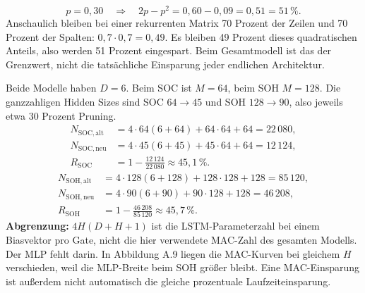 \[
p=0{,}30\quad\Rightarrow\quad 2p-p^2=0{,}60-0{,}09=0{,}51=51\,\%.
\]
Anschaulich bleiben bei einer rekurrenten Matrix 70 Prozent der Zeilen und 70 Prozent der Spalten: $0{,}7\cdot0{,}7=0{,}49$. Es bleiben 49 Prozent dieses quadratischen Anteils, also werden 51 Prozent eingespart. Beim Gesamtmodell ist das der Grenzwert, nicht die tatsächliche Einsparung jeder endlichen Architektur.

Beide Modelle haben $D=6$. Beim SOC ist $M=64$, beim SOH $M=128$. Die ganzzahligen Hidden Sizes sind SOC $64\to45$ und SOH $128\to90$, also jeweils etwa 30 Prozent Pruning.
\[
\begin{aligned}
N_{\mathrm{SOC,alt}}&=4\cdot64(6+64)+64\cdot64+64=22\,080,\\
N_{\mathrm{SOC,neu}}&=4\cdot45(6+45)+45\cdot64+64=12\,124,\\
R_{\mathrm{SOC}}&=1-\frac{12\,124}{22\,080}\approx45{,}1\,\%.
\end{aligned}
\]
\[
\begin{aligned}
N_{\mathrm{SOH,alt}}&=4\cdot128(6+128)+128\cdot128+128=85\,120,\\
N_{\mathrm{SOH,neu}}&=4\cdot90(6+90)+90\cdot128+128=46\,208,\\
R_{\mathrm{SOH}}&=1-\frac{46\,208}{85\,120}\approx45{,}7\,\%.
\end{aligned}
\]
\textbf{Abgrenzung:} $4H(D+H+1)$ ist die LSTM-Parameterzahl bei einem Biasvektor pro Gate, nicht die hier verwendete MAC-Zahl des gesamten Modells. Der MLP fehlt darin. In Abbildung A.9 liegen die MAC-Kurven bei gleichem $H$ verschieden, weil die MLP-Breite beim SOH größer bleibt. Eine MAC-Einsparung ist außerdem nicht automatisch die gleiche prozentuale Laufzeiteinsparung.
